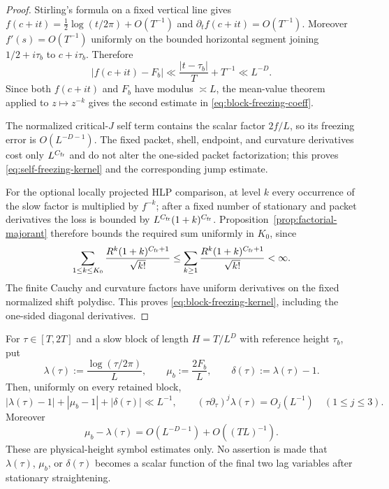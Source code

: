 \begin{proof}
Stirling's formula on a fixed vertical line gives
$f(c+it)=\frac12\log(t/2\pi)+O(T^{-1})$ and
$\partial_t f(c+it)=O(T^{-1})$. Moreover $f'(s)=O(T^{-1})$ uniformly on the
bounded horizontal segment joining $1/2+i\tau_b$ to $c+i\tau_b$. Therefore
\[
|f(c+it)-F_b|
\ll \frac{|t-\tau_b|}{T}+T^{-1}
\ll L^{-D}.
\]
Since both $f(c+it)$ and $F_b$ have modulus
$\asymp L$, the mean-value theorem applied to $z\mapsto z^{-k}$ gives the
second estimate in \eqref{eq:block-freezing-coeff}.

The normalized critical-$J$ self term contains the scalar factor $2f/L$, so
its freezing error is $O(L^{-D-1})$.  The fixed packet, shell, endpoint, and
curvature derivatives cost only $L^{C_{\rm fr}}$ and do not alter the
one-sided packet factorization; this proves \eqref{eq:self-freezing-kernel} and
the corresponding jump estimate.

For the optional locally projected HLP comparison, at level $k$ every
occurrence of the slow factor is
multiplied by $f^{-k}$; after a fixed number of stationary and packet
derivatives the loss is bounded by
$L^{C_{\rm fr}}(1+k)^{C_{\rm fr}}$. Proposition~\ref{prop:factorial-majorant}
therefore bounds the required sum uniformly in $K_0$, since
\[
\sum_{1\le k\le K_0}
\frac{R^k(1+k)^{C_{\rm fr}+1}}{\sqrt{k!}}
\le
\sum_{k\ge1}
\frac{R^k(1+k)^{C_{\rm fr}+1}}{\sqrt{k!}}<\infty.
\]
The finite Cauchy and curvature factors have uniform derivatives on the fixed
normalized shift polydisc. This proves
\eqref{eq:block-freezing-kernel}, including the one-sided diagonal derivatives.
\end{proof}

\begin{lemma}
\label{lem:principal-parameter-symbol}
For $\tau\in[T,2T]$ and a slow block of length $H=T/L^D$ with reference
height $\tau_b$, put
\[
\lambda(\tau):=\frac{\log(\tau/2\pi)}L,
\qquad
\mu_b:=\frac{2F_b}{L},
\qquad
\delta(\tau):=\lambda(\tau)-1.
\]
Then, uniformly on every retained block,
\begin{equation}
\boxed{
|\lambda(\tau)-1|+|\mu_b-1|+|\delta(\tau)|\ll L^{-1},
\qquad
(\tau\partial_\tau)^j\lambda(\tau)=O_j(L^{-1})\quad(1\le j\le3).
}
\label{eq:principal-field-symbol-bound}
\end{equation}
Moreover
\begin{equation}
\boxed{
\mu_b-\lambda(\tau)
=O(L^{-D-1})+O((TL)^{-1}).
}
\label{eq:principal-mu-lambda-small}
\end{equation}
These are physical-height symbol estimates only.  No assertion is made that
$\lambda(\tau)$, $\mu_b$, or $\delta(\tau)$ becomes a scalar function of the
final two lag variables after stationary straightening.
\end{lemma}

